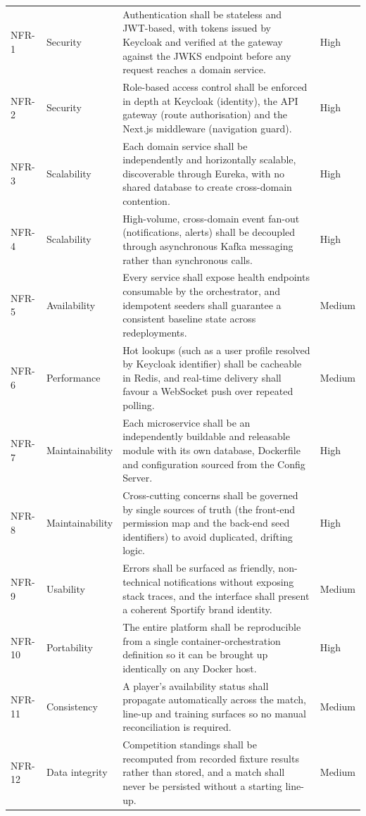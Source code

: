 \begin{longtable}{p{} p{} p{} p{}}
NFR-1  & Security & Authentication shall be stateless and JWT-based, with tokens issued by Keycloak and verified at the gateway against the JWKS endpoint before any request reaches a domain service. & High \\
NFR-2  & Security & Role-based access control shall be enforced in depth at Keycloak (identity), the API gateway (route authorisation) and the Next.js middleware (navigation guard). & High \\
NFR-3  & Scalability & Each domain service shall be independently and horizontally scalable, discoverable through Eureka, with no shared database to create cross-domain contention. & High \\
NFR-4  & Scalability & High-volume, cross-domain event fan-out (notifications, alerts) shall be decoupled through asynchronous Kafka messaging rather than synchronous calls. & High \\
NFR-5  & Availability & Every service shall expose health endpoints consumable by the orchestrator, and idempotent seeders shall guarantee a consistent baseline state across redeployments. & Medium \\
NFR-6  & Performance & Hot lookups (such as a user profile resolved by Keycloak identifier) shall be cacheable in Redis, and real-time delivery shall favour a WebSocket push over repeated polling. & Medium \\
NFR-7  & Maintainability & Each microservice shall be an independently buildable and releasable module with its own database, Dockerfile and configuration sourced from the Config Server. & High \\
NFR-8  & Maintainability & Cross-cutting concerns shall be governed by single sources of truth (the front-end permission map and the back-end seed identifiers) to avoid duplicated, drifting logic. & High \\
NFR-9  & Usability & Errors shall be surfaced as friendly, non-technical notifications without exposing stack traces, and the interface shall present a coherent Sportify brand identity. & Medium \\
NFR-10 & Portability & The entire platform shall be reproducible from a single container-orchestration definition so it can be brought up identically on any Docker host. & High \\
NFR-11 & Consistency & A player's availability status shall propagate automatically across the match, line-up and training surfaces so no manual reconciliation is required. & Medium \\
NFR-12 & Data integrity & Competition standings shall be recomputed from recorded fixture results rather than stored, and a match shall never be persisted without a starting line-up. & Medium \\
\end{longtable}
\renewcommand{\arraystretch}{1.0}

